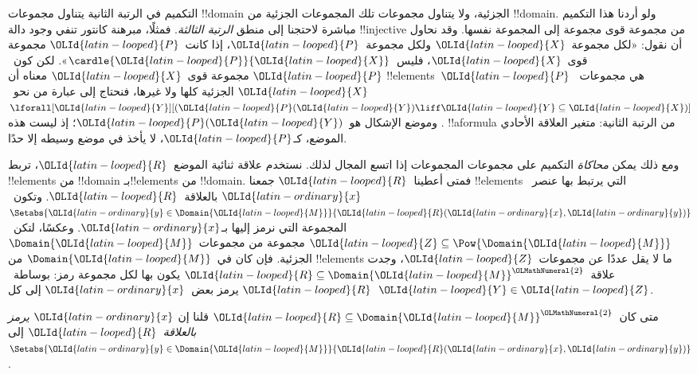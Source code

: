 \documentclass[../../../include/open-logic-section]{subfiles}
\begin{document}


\begin{explain}
التكميم في الرتبة الثانية يتناول مجموعات !!{domain} الجزئية،
ولا يتناول مجموعات تلك المجموعات الجزئية من !!{domain}.
ولو أردنا هذا التكميم مباشرة لاحتجنا إلى منطق \emph{الرتبة الثالثة}.
فمثلًا، مبرهنة كانتور تنفي وجود دالة !!{injective} من مجموعة
قوى مجموعة إلى المجموعة نفسها. وقد نحاول أن نقول:
«لكل مجموعة~$\OLId{latin-looped}{X}$ ولكل مجموعة~$\OLId{latin-looped}{P}$، إذا كانت~$\OLId{latin-looped}{P}$ مجموعة
قوى~$\OLId{latin-looped}{X}$، فليس~$\cardle{\OLId{latin-looped}{P}}{\OLId{latin-looped}{X}}$».
لكن كون~$\OLId{latin-looped}{P}$ مجموعة قوى~$\OLId{latin-looped}{X}$ معناه أن !!{element}s~$\OLId{latin-looped}{P}$
هي مجموعات~$\OLId{latin-looped}{X}$ الجزئية كلها ولا غيرها، فنحتاج إلى عبارة
من نحو~$\lforall[\OLId{latin-looped}{Y}][(\OLId{latin-looped}{P}(\OLId{latin-looped}{Y}) \liff \OLId{latin-looped}{Y} \subseteq \OLId{latin-looped}{X})]$.
وموضع الإشكال هو~$\OLId{latin-looped}{P}(\OLId{latin-looped}{Y})$؛ إذ ليست هذه !!a{formula} من الرتبة
الثانية: متغير العلاقة الأحادي الموضع، كـ$\OLId{latin-looped}{P}$، لا يأخذ في موضع
وسيطه إلا حدًا.

ومع ذلك يمكن \emph{محاكاة} التكميم على مجموعات المجموعات
إذا اتسع المجال لذلك. نستخدم علاقة ثنائية الموضع~$\OLId{latin-looped}{R}$،
تربط !!{element}s من !!{domain} بـ!!{element}s من !!{domain}.
فمتى أعطينا~$\OLId{latin-looped}{R}$ جمعنا !!{element}s التي يرتبط بها عنصر~$\OLId{latin-ordinary}{x}$
بالعلاقة~$\OLId{latin-looped}{R}$. وتكون~$\Setabs{\OLId{latin-ordinary}{y} \in \Domain{\OLId{latin-looped}{M}}}{\OLId{latin-looped}{R}(\OLId{latin-ordinary}{x},\OLId{latin-ordinary}{y})}$
المجموعة التي نرمز إليها بـ$\OLId{latin-ordinary}{x}$.
وعكسًا، لتكن~$\OLId{latin-looped}{Z} \subseteq \Pow{\Domain{\OLId{latin-looped}{M}}}$ مجموعة من
مجموعات~$\Domain{\OLId{latin-looped}{M}}$ الجزئية. فإن كان في~$\Domain{\OLId{latin-looped}{M}}$ من
!!{element}s ما لا يقل عددًا عن مجموعات~$\OLId{latin-looped}{Z}$، وجدت
علاقة~$\OLId{latin-looped}{R} \subseteq \Domain{\OLId{latin-looped}{M}}^\OLMathNumeral{2}$ يكون بها لكل مجموعة رمز:
بوساطة~$\OLId{latin-looped}{R}$ يرمز بعض~$\OLId{latin-ordinary}{x}$ إلى كل~$\OLId{latin-looped}{Y} \in \OLId{latin-looped}{Z}$.
\end{explain}

\begin{defn}
متى كان~$\OLId{latin-looped}{R} \subseteq \Domain{\OLId{latin-looped}{M}}^\OLMathNumeral{2}$ قلنا إن
\emph{$\OLId{latin-ordinary}{x}$ يرمز بالعلاقة~$\OLId{latin-looped}{R}$} إلى
$\Setabs{\OLId{latin-ordinary}{y} \in \Domain{\OLId{latin-looped}{M}}}{\OLId{latin-looped}{R}(\OLId{latin-ordinary}{x}, \OLId{latin-ordinary}{y})}$.
\end{defn}
\end{document}
